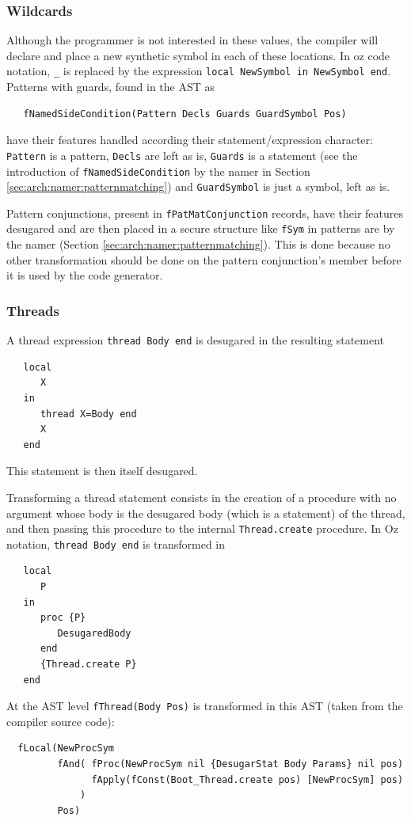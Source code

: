 \documentclass[a4paper]{memoir}
\begin{document}
\subsubsection{Wildcards}
Although the programmer is not interested in these values, the compiler will declare and place a new synthetic symbol in each of these locations. In oz code notation, \lstinline!_! is replaced by the expression \lstinline!local NewSymbol in NewSymbol end!.
Patterns with guards, found in the AST as 
\begin{lstlisting}
   fNamedSideCondition(Pattern Decls Guards GuardSymbol Pos)
\end{lstlisting}
have their features handled according their statement/expression character:
\lstinline!Pattern! is a pattern, \lstinline!Decls! are left as is,
\lstinline!Guards! is a statement (see the introduction
of \lstinline!fNamedSideCondition! by the namer in Section
\ref{sec:arch:namer:patternmatching}) and \lstinline!GuardSymbol! is just a
symbol, left as is.

Pattern conjunctions, present in \lstinline!fPatMatConjunction! records, have
their features desugared and are then placed in a secure structure like
\lstinline!fSym! in
patterns are by the namer (Section \ref{sec:arch:namer:patternmatching}).
This is done because no other transformation should be done on the pattern
conjunction's member before it is used by the code generator.


\subsubsection{Threads}
A thread expression \lstinline!thread Body end! is desugared in the resulting
statement 
\begin{lstlisting}
   local 
      X 
   in 
      thread X=Body end 
      X 
   end 
\end{lstlisting}

This statement is then itself desugared.

Transforming a thread statement consists in the creation of a procedure with no
argument whose body is the desugared body (which is a statement) of the thread,
and then passing this procedure to the internal \lstinline!Thread.create!
procedure.
In Oz notation, \lstinline!thread Body end! is transformed in 
\begin{lstlisting}
   local 
      P 
   in 
      proc {P} 
         DesugaredBody 
      end 
      {Thread.create P}
   end
\end{lstlisting}
At the AST level \lstinline!fThread(Body Pos)! is transformed in this AST (taken from the compiler source code):
\begin{lstlisting}
  fLocal(NewProcSym 
         fAnd( fProc(NewProcSym nil {DesugarStat Body Params} nil pos) 
               fApply(fConst(Boot_Thread.create pos) [NewProcSym] pos)
             ) 
         Pos)
\end{lstlisting}
\end{document}
